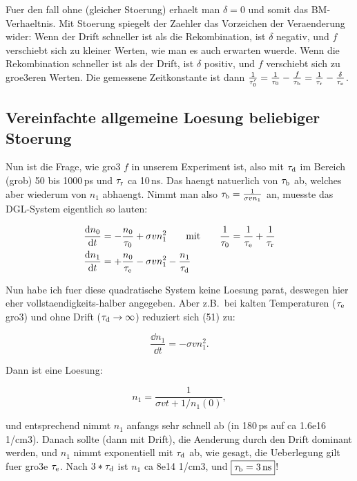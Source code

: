 \noindent
Fuer den fall ohne (gleicher Stoerung) erhaelt man $\delta = 0$ und somit das BM-Verhaeltnis. 
Mit Stoerung spiegelt der Zaehler das Vorzeichen der Veraenderung wider: 
Wenn der Drift schneller ist als die Rekombination, ist $\delta$ negativ, und $f$ verschiebt sich zu kleiner Werten, wie man es auch erwarten wuerde.
Wenn die Rekombination schneller ist als der Drift, ist $\delta$ positiv, und $f$ verschiebt sich zu groe3eren Werten.
Die gemessene Zeitkonstante ist dann $\frac{1}{\tau_{0}^{\prime}} = \frac{1}{\tau_{0}} - \frac{f}{\tau_{\textrm{b}}} = \frac{1}{\tau_\textrm{r}} - \frac{\delta}{\tau_\textrm{e}}$.

\subsection{Vereinfachte allgemeine Loesung beliebiger Stoerung}
Nun ist die Frage, wie gro3 $f$ in unserem Experiment ist, also mit $\tau_{\textrm{d}}$ im Bereich (grob) 50 bis 1000\,ps und $\tau_\textrm{r}$ ca 10\,ns. 
Das haengt natuerlich von $\tau_{\textrm{b}}$ ab, welches aber wiederum von $n_1$ abhaengt.
Nimmt man also $\tau_{\textrm{b}} = \frac{1}{\sigma v n_1}$ an, muesste das DGL-System eigentlich so lauten:

\begin{align}
 \frac{\mathrm d n_0}{\mathrm d t}  &= -\frac{n_0}{\tau_{0}} + \sigma v n_1^2  \qquad \textrm{mit}    \qquad\frac{1}{\tau_{0}}= \frac{1}{\tau_\textrm{e}} + \frac{1}{\tau_\textrm{r}} \\
 \frac{\mathrm d n_1}{\mathrm d t}  &= +\frac{n_0}{\tau_\textrm{e}} - \sigma v n_1^2 - \frac{n_1}{\tau_{\textrm{d}}}
 \label{math:diff33} 
\end{align}



\noindent
Nun habe ich fuer diese quadratische System keine Loesung parat, deswegen hier eher vollstaendigkeits-halber angegeben. 
Aber z.B.\ bei kalten Temperaturen ($\tau_\textrm{e}$ gro3) und ohne Drift ($\tau_{\textrm{d}} \rightarrow \infty$) reduziert sich (51) zu:

\begin{equation}
 \frac{\dd n_1}{\dd t} = - \sigma v n_1^2.
\end{equation}

\noindent
Dann ist eine Loesung:

\begin{equation}
 n_1 = \frac{1}{\sigma v t + 1/n_1(0)},
\end{equation}

\noindent
und entsprechend nimmt $n_1$ anfangs sehr schnell ab (in 180\,ps auf ca 1.6e16 1/cm3). 
Danach sollte (dann mit Drift), die Aenderung durch den Drift dominant werden, und $n_1$ nimmt exponentiell mit $\tau_{\textrm{d}}$ ab, wie gesagt, die Ueberlegung gilt fuer gro3e $\tau_\textrm{e}$. 
Nach $3*\tau_{\textrm{d}}$ ist $n_1$ ca 8e14 1/cm3, und $\boxed{\tau_{\textrm{b}} = \SI{3}{\nano\second}}$!

